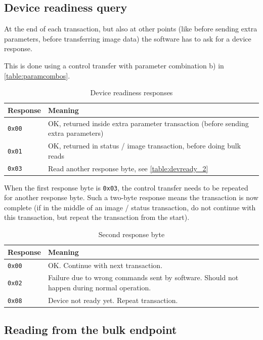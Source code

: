 \documentclass{article}
\begin{document}
\subsection{Device readiness query}
\label{ssec:devready}

At the end of each transaction, but also at other points (like before
sending extra parameters, before transferring image data) the software has to ask for a device response.

This is done using a control transfer with parameter combination b) in \autoref{table:paramcombos}.

\begin{table}[H]
  \caption{Device readiness responses}
  \centering
  \begin{tabularx}{\textwidth}{l | X}
    Response & Meaning \\ \hline
    {\tt 0x00} & OK, returned inside extra parameter transaction (before sending extra parameters) \\
    {\tt 0x01} & OK, returned in status / image transaction, before doing bulk reads \\
    {\tt 0x03} & Read another response byte, see \autoref{table:devready_2} \\
  \end{tabularx}
\end{table}

When the first response byte is {\tt 0x03}, the control transfer needs to be repeated for another
response byte. Such a two-byte response means the transaction is now complete (if in the middle
of an image / status transaction, do not continue with this transaction, but repeat the transaction from the start).

\begin{table}[H]
  \caption{Second response byte}
  \centering
  \begin{tabularx}{\textwidth}{l | X}
    Response & Meaning \\ \hline
    {\tt 0x00} & OK. Continue with next transaction. \\
    {\tt 0x02} & Failure due to wrong commands sent by software. Should not happen during normal operation. \\
    {\tt 0x08} & Device not ready yet. Repeat transaction. \\
  \end{tabularx}
  \label{table:devready_2}
\end{table}

\subsection{Reading from the bulk endpoint}
\label{ssec:bulkread}
\end{document}
